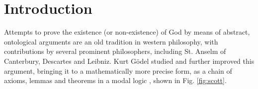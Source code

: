 \documentclass{birkjour}
\theoremstyle{definition}
\theoremstyle{remark}
\numberwithin{equation}{section}
\begin{document}
\maketitle
\section{Introduction}

Attempts to prove the
existence (or non-existence) of God by means of abstract, ontological
arguments are an old tradition in western philosophy, with contributions by several prominent philosophers, including St. Anselm of
Canterbury, Descartes and Leibniz. Kurt G{\"o}del studied and further improved this argument, bringing it to a mathematically more precise form, as a chain of axioms, lemmas and theorems in a modal logic \cite{GoedelNotes,ScottNotes}, shown in Fig. \ref{fig:scott}.
\end{document}
